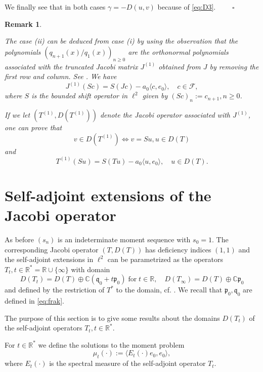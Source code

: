 \documentclass [12pt]{article}
\newtheorem{rem}[thm]{Remark}
\newcommand{\C}{\mathbb{C}}
\newcommand{\R}{\mathbb{R}}
\begin{document}
We finally see that in both cases $\gamma=-D(u,v)$ because of \eqref{eq:D3}.
$\qquad\square$

\begin{rem}\label{thm:trunc}{\rm The case (ii) can be deduced from case (i) by using the observation that
the polynomials $(q_{n+1}(x)/q_1(x))_{n\ge 0}$ are the orthonormal polynomials associated with the truncated Jacobi matrix $J^{(1)}$ obtained from $J$ by removing the first row and column. See \cite[p. 28]{Ak}. We have
$$
J^{(1)}(Sc)=S(Jc)-a_0\langle c, e_0\rangle,\quad c\in\mathcal F,
$$
where $S$ is the bounded shift operator in $\ell^2$ given by $(Sc)_n:=c_{n+1}, n\ge 0$. 
  
If we let $(T^{(1)}, D(T^{(1)}))$ denote the Jacobi operator associated with $J^{(1)}$, one can prove that 
$$
v\in D(T^{(1)})\iff v=Su, u\in D(T)
$$
and 
$$
T^{(1)}(Su)=S(Tu)-a_0\langle u, e_0\rangle,\quad u\in D(T).
$$
}
\end{rem}









\section{Self-adjoint extensions of the Jacobi operator}

As before $(s_n)$ is an indeterminate moment sequence with $s_0=1$. The corresponding Jacobi operator $(T,D(T))$ has deficiency indices $(1,1)$ and the self-adjoint extensions in
$\ell^2$ can be parametrized as the operators $T_t, t\in\R^*=\R\cup \{\infty\}$ with domain  
\begin{equation}\label{eq:domTt}
D(T_t)=D(T)\oplus \C  (\mathfrak{q}_0 + t\mathfrak{p}_0) \;\mbox{for}\;t\in\R,\quad
D(T_\infty)=D(T)\oplus \C \mathfrak{p}_0
\end{equation}
and defined by the restriction of $T^*$ to the domain, cf. \cite[Theorem 6.23]{Sch}.
We recall that $\mathfrak{p}_0, \mathfrak{q}_0$ are defined in \eqref{eq:frak}.

The purpose of this section is to give some results about the domains $D(T_t)$ of the self-adjoint operators $T_t, t\in\R^*$.

For $t\in\R^*$ we define the solutions to the moment problem
\begin{equation}\label{eq:Next}
\mu_t(\cdot):=\langle E_t(\cdot)e_0,e_0\rangle,
\end{equation}
where $E_t(\cdot)$ is the spectral measure of the self-adjoint operator $T_t$.
\end{document}
